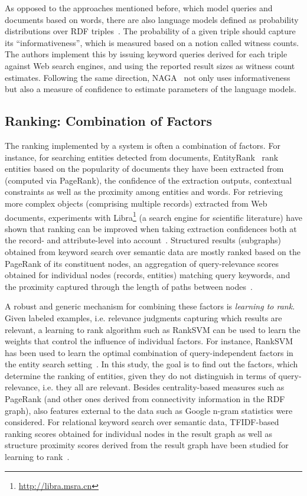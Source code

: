 As opposed to the approaches mentioned before, which model queries and documents based on words, there are also language models defined as probability distributions over RDF triples~\cite{DBLP:journals/debu/ElbassuoniRSW10}. The probability of a given triple should capture its ``informativeness'', which is measured based on a notion called witness counts. The authors implement this by issuing keyword queries derived for each triple against Web search engines, and using the reported result sizes as witness count estimates. Following the same direction, NAGA~\cite{DBLP:conf/icde/KasneciSIRW08} not only uses informativeness but also a measure of confidence to estimate parameters of the language models. 

\subsection{Ranking: Combination of Factors}
The ranking implemented by a system is often a combination of factors. For instance, for searching entities detected from documents, EntityRank~\cite{DBLP:conf/vldb/ChengYC07} rank entities based on the popularity of documents they have been extracted from (computed via PageRank), the confidence of the extraction outputs, contextual constraints as well as the proximity among entities and words. For retrieving more complex objects (comprising multiple records) extracted from Web documents, experiments with Libra\footnote{\url{http://libra.msra.cn}} (a search engine for scientific literature) have shown that ranking can be improved when taking extraction confidences both at the record- and attribute-level into account~\cite{DBLP:conf/www/NieMSWM07}. Structured results (subgraphs) obtained from keyword search over semantic data are mostly ranked based on the PageRank of its constituent nodes, an aggregation of query-relevance scores obtained for individual nodes (records, entities) matching query keywords, and the proximity captured through the length of paths between nodes~\cite{DBLP:conf/icde/TranWRC09}. 

A robust and generic mechanism for combining these factors is \emph{learning to rank}. Given labeled examples, i.e. relevance judgments capturing which results are relevant, a learning to rank algorithm such as RankSVM can be used to learn the weights that control the influence of individual factors. For instance, RankSVM has been used to learn the optimal combination of query-independent factors in the entity search setting~\cite{DBLP:conf/eswc/Tran12}. In this study, the goal is to find out the factors, which determine the ranking of entities, given they do not distinguish in terms of query-relevance, i.e. they all are relevant. Besides centrality-based measures such as PageRank (and other ones derived from connectivity information in the RDF graph), also features external to the data such as Google n-gram statistics were considered. For relational keyword search over semantic data, TFIDF-based ranking scores obtained for individual nodes in the result graph as well as structure proximity scores derived from the result graph have been studied for learning to rank~\cite{DBLP:conf/cikm/CoffmanW11}. 


